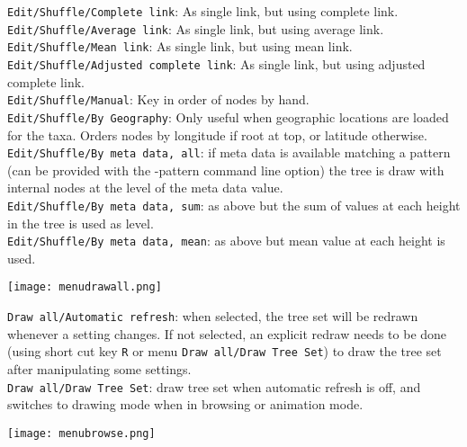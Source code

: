 \documentclass{article}
\begin{document}
{\tt Edit/Shuffle/Complete link}: As single link, but using complete link.\\
{\tt Edit/Shuffle/Average link}: As single link, but using average link.\\
{\tt Edit/Shuffle/Mean link}: As single link, but using mean link.\\
{\tt Edit/Shuffle/Adjusted complete link}: As single link, but using adjusted complete link.\\
{\tt Edit/Shuffle/Manual}: Key in order of nodes by hand.\\
{\tt Edit/Shuffle/By Geography}: Only useful when geographic locations are loaded for the taxa.
Orders nodes by longitude if root at top, or latitude otherwise.\\
{\tt Edit/Shuffle/By meta data, all}: if meta data is available matching a pattern (can be
provided with the -pattern command line option) the tree is draw with internal nodes at
the level of the meta data value.\\
{\tt Edit/Shuffle/By meta data, sum}: as above but the sum of values at each height in the
tree is used as level.\\
{\tt Edit/Shuffle/By meta data, mean}: as above but mean value at each height is used.\\


\begin{center}
\texttt{[image: menudrawall.png]}
\end{center}

\noindent
{\tt Draw all/Automatic refresh}: when selected, the tree set will be redrawn whenever a setting
changes. If not selected, an explicit redraw needs to be done (using short cut key {\tt R} or 
menu {\tt Draw all/Draw Tree Set}) to draw the tree set after manipulating some settings.\\
{\tt Draw all/Draw Tree Set}: draw tree set when automatic refresh is off, and switches to
drawing mode when in browsing or animation mode.


\begin{center}
\texttt{[image: menubrowse.png]}
\end{center}
\end{document}
